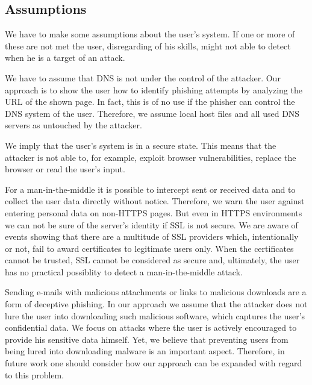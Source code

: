 \subsection{Assumptions}
\label{s:assumptions}
We have to make some assumptions about the user's system. 
If one or more of these are not met the user, disregarding of his skills, might not able to detect when he is a target of an attack.
\begin{description}[leftmargin=0cm]
	\item[Secure DNS] We have to assume that DNS is not under the control of the attacker.
	Our approach is to show the user how to identify phishing attempts by analyzing the URL of the shown page.
	In fact, this is of no use if the phisher can control the DNS system of the user.
	Therefore, we assume local host files and all used DNS servers as untouched by the attacker.
	\item[Secure Smartphone] We imply that the user's system is in a secure state.
	This means that the attacker is not able to, for example, exploit browser vulnerabilities, replace the browser or read the user's input.
	\item[Secure SSL] 
	For a man-in-the-middle it is possible to intercept sent or received data and to collect the user data directly without notice.
	Therefore, we warn the user against entering personal data on non-HTTPS pages.
	But even in HTTPS environments we can not be sure of the server's identity if SSL is not secure.
	We are aware of events showing that there are a multitude of SSL providers which, intentionally or not, fail to award certificates to legitimate users only.
	When the certificates cannot be trusted, SSL cannot be considered as secure and, ultimately, the user has no practical possiblity to detect a man-in-the-middle attack.	
	\item[Malware] 
	Sending e-mails with malicious attachments or links to malicious downloads are a form of deceptive phishing.
	In our approach we assume that the attacker does not lure the user into downloading such malicious software, which captures the user's confidential data.
	We focus on attacks where the user is actively encouraged to provide his sensitive data himself.
	Yet, we believe that preventing users from being lured into downloading malware is an important aspect.
	Therefore, in future work one should consider how our approach can be expanded with regard to this problem.
	
\end{description}

